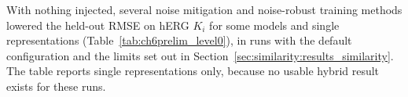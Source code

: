 

With nothing injected, several noise mitigation and noise-robust training methods lowered the held-out RMSE on hERG $K_i$ for some models and single representations (Table~\ref{tab:ch6prelim_level0}), in runs with the default configuration and the limits set out in Section~\ref{sec:similarity:results_similarity}. The table reports single representations only, because no usable hybrid result exists for these runs.

